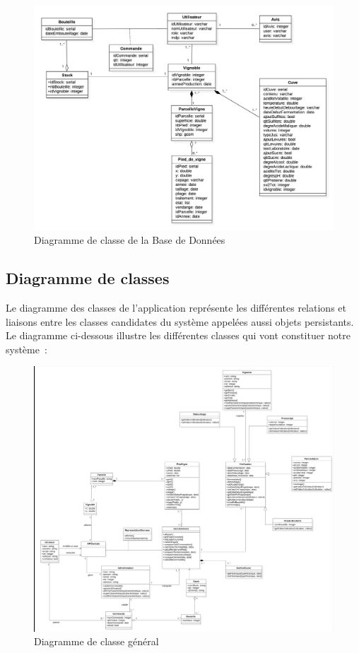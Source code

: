 \documentclass[a4paper, titlepage]{report}
\begin{document}
\clearpage
\begin{figure}[!ht]
\centering
\includegraphics{Images/DiagrammeClasseBDD.jpg}
\caption{Diagramme de classe de la Base de Données}
\end{figure}

\clearpage
\subsection{Diagramme de classes}

Le diagramme des classes de l'application représente les différentes
relations et liaisons entre les classes candidates du système appelées
aussi objets persistants. Le diagramme ci-dessous illustre les
différentes classes qui vont constituer notre système~:

\begin{figure}[!ht]
\centering
\includegraphics{Images/DiagrammeClasse.png}
\caption{Diagramme de classe général}
\end{figure}
\end{document}
